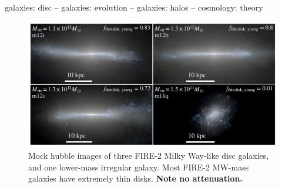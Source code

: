 \documentclass[fleqn,usenatbib]{mnras}
\begin{document}
\begin{keywords}
galaxies: disc -- galaxies: evolution -- galaxies: halos -- cosmology: theory
\end{keywords}



\begin{figure}
    \centering
    \includegraphics[width=\textwidth]{figures/stars.pdf}
    \caption{
    Mock hubble images of three FIRE-2 Milky Way-like disc galaxies, and one lower-mass irregular galaxy.
    Most FIRE-2 MW-mass galaxies have extremely thin disks.
    \textbf{Note no attenuation.}
    }
    \label{f: stars}
\end{figure}
\end{document}
